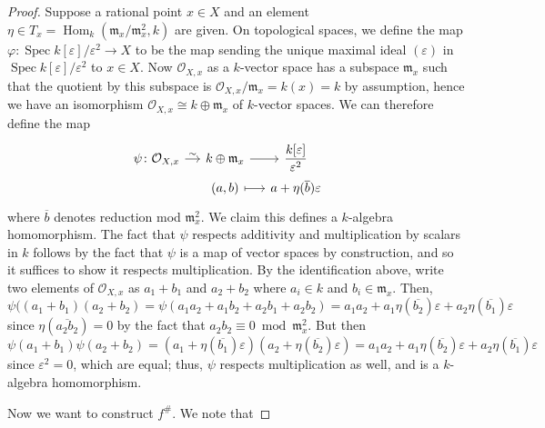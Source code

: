 \documentclass[10pt]{article}
\theoremstyle{definition}
\theoremstyle{remark}
\numberwithin{equation}{section}
\numberwithin{figure}{subsubsection}
\DeclareMathOperator{\Spec}{Spec}
\DeclareMathOperator{\Hom}{Hom}
\newcommand{\OO}{\mathcal{O}}
\begin{document}
\begin{proof}
  Suppose a rational point $x \in X$ and an element $\eta \in T_x =
  \Hom_k(\mathfrak{m}_x/\mathfrak{m}_x^2,k)$ are given. On topological spaces, we
  define the map $\varphi\colon \Spec k[\varepsilon]/\varepsilon^2 \to X$ to be the
  map sending the unique maximal ideal $(\varepsilon)$ in $\Spec
  k[\varepsilon]/\varepsilon^2$ to $x \in X$. Now $\OO_{X,x}$ as a $k$-vector space
  has a subspace $\mathfrak{m}_x$ such that the quotient by this subspace is
  $\OO_{X,x}/\mathfrak{m}_x = k(x) = k$ by assumption, hence we have an isomorphism
  $\OO_{X,x} \cong k \oplus \mathfrak{m}_x$ of $k$-vector spaces. We can therefore
  define the map
  \begin{equation*}
    \begin{tikzcd}[row sep=0,column sep=small]
      \mathllap{\psi\colon} \OO_{X,x} \rar{\sim} & k \oplus \mathfrak{m}_x \rar &
      \dfrac{k[\varepsilon]}{\varepsilon^2}\\
      & (a,b) \rar[mapsto] & a + \eta(\overline{b})\varepsilon
    \end{tikzcd}
  \end{equation*}
  where $\overline{b}$ denotes reduction mod $\mathfrak{m}_x^2$.
  We claim this defines a $k$-algebra homomorphism. The fact that $\psi$
  respects additivity and multiplication by scalars in $k$ follows by the fact that
  $\psi$ is a map of vector spaces by construction, and so it suffices to show it
  respects multiplication. By the identification above, write two elements of
  $\OO_{X,x}$ as $a_1 + b_1$ and $a_2 + b_2$ where $a_i \in k$ and $b_i \in
  \mathfrak{m}_x$. Then,
  \begin{equation*}
    \psi((a_1 + b_1)(a_2 + b_2) = \psi(a_1a_2 + a_1b_2 + a_2b_1 + a_2b_2) =
    a_1a_2 + a_1\eta(\overline{b_2})\varepsilon + a_2\eta(\overline{b_1})\varepsilon
  \end{equation*}
  since $\eta(\overline{a_2b_2}) = 0$ by the fact that $a_2b_2 \equiv 0 \bmod
  \mathfrak{m}_x^2$. But then
  \begin{equation*}
    \psi(a_1+b_1)\psi(a_2+b_2) = (a_1 + \eta(\overline{b_1})\varepsilon)(a_2 +
    \eta(\overline{b_2})\varepsilon) = a_1a_2 + a_1\eta(\overline{b_2})\varepsilon +
    a_2\eta(\overline{b_1})\varepsilon
  \end{equation*}
  since $\varepsilon^2 = 0$, which are equal; thus, $\psi$ respects
  multiplication as well, and is a $k$-algebra homomorphism.
  \par Now we want to construct $f^\#$. We note that

\end{proof}
\end{document}
